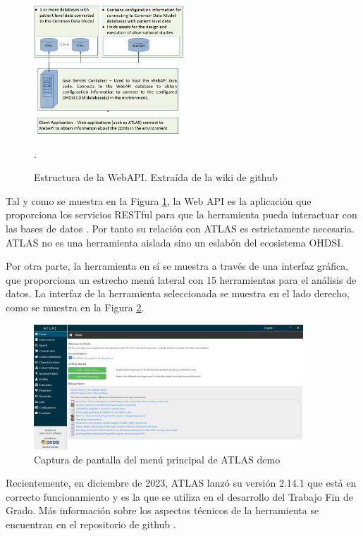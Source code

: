 \begin{figure}[H]
    \centering
    \includegraphics[width=0.50\textwidth]{figures/webAPIwiki.png}
     \caption{Estructura de la WebAPI. Extraída de la wiki de github \cite{githubWebAPIwiki}}.
    \label{fig:webAPIwiki}
\end{figure}

Tal y como se muestra en la Figura \ref{fig:webAPIwiki}, la Web API es la aplicación que proporciona los servicios RESTful para que la herramienta pueda interactuar con las bases de datos \cite{githubWebAPIwiki}. Por tanto su relación con ATLAS es estrictamente necesaria. ATLAS no es una herramienta aislada sino un eslabón del ecosistema OHDSI.

Por otra parte, la herramienta en sí se muestra a través de una interfaz gráfica, que proporciona un estrecho menú lateral con 15 herramientas para el análisis de datos. La interfaz de la herramienta seleccionada se muestra en el lado derecho, como se muestra en la Figura \ref{fig:ATLASdemoHome}.

\begin{figure}[H]
\centering
\includegraphics[width=0.90\textwidth]{figures/ATLASdemoHome.png}
     \caption{Captura de pantalla del menú principal de ATLAS demo}
    \label{fig:ATLASdemoHome}
\end{figure}

Recientemente, en diciembre de 2023, ATLAS lanzó su versión 2.14.1 que está en correcto funcionamiento y es la que se utiliza en el desarrollo del Trabajo Fin de Grado. Más información sobre los aspectos técnicos de la herramienta se encuentran en el repositorio de github \cite{githubATLAS}.

